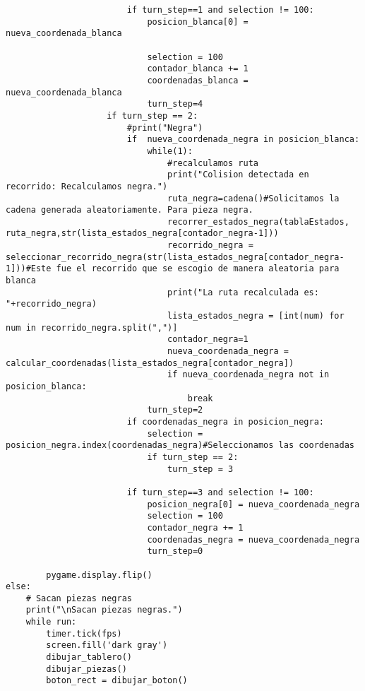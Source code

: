 \begin{lstlisting}
                        if turn_step==1 and selection != 100:
                            posicion_blanca[0] = nueva_coordenada_blanca
                            
                            selection = 100
                            contador_blanca += 1
                            coordenadas_blanca = nueva_coordenada_blanca
                            turn_step=4
                    if turn_step == 2:
                        #print("Negra")
                        if  nueva_coordenada_negra in posicion_blanca:
                            while(1):
                                #recalculamos ruta
                                print("Colision detectada en recorrido: Recalculamos negra.")
                                ruta_negra=cadena()#Solicitamos la cadena generada aleatoriamente. Para pieza negra.
                                recorrer_estados_negra(tablaEstados, ruta_negra,str(lista_estados_negra[contador_negra-1]))
                                recorrido_negra = seleccionar_recorrido_negra(str(lista_estados_negra[contador_negra-1]))#Este fue el recorrido que se escogio de manera aleatoria para blanca
                                print("La ruta recalculada es: "+recorrido_negra)
                                lista_estados_negra = [int(num) for num in recorrido_negra.split(",")]
                                contador_negra=1
                                nueva_coordenada_negra = calcular_coordenadas(lista_estados_negra[contador_negra])
                                if nueva_coordenada_negra not in posicion_blanca:
                                    break
                            turn_step=2
                        if coordenadas_negra in posicion_negra:
                            selection = posicion_negra.index(coordenadas_negra)#Seleccionamos las coordenadas
                            if turn_step == 2:
                                turn_step = 3
                            
                        if turn_step==3 and selection != 100:
                            posicion_negra[0] = nueva_coordenada_negra
                            selection = 100
                            contador_negra += 1
                            coordenadas_negra = nueva_coordenada_negra
                            turn_step=0

        pygame.display.flip()
else:
    # Sacan piezas negras
    print("\nSacan piezas negras.")
    while run:
        timer.tick(fps)
        screen.fill('dark gray')
        dibujar_tablero()
        dibujar_piezas()
        boton_rect = dibujar_boton()


\end{lstlisting}
